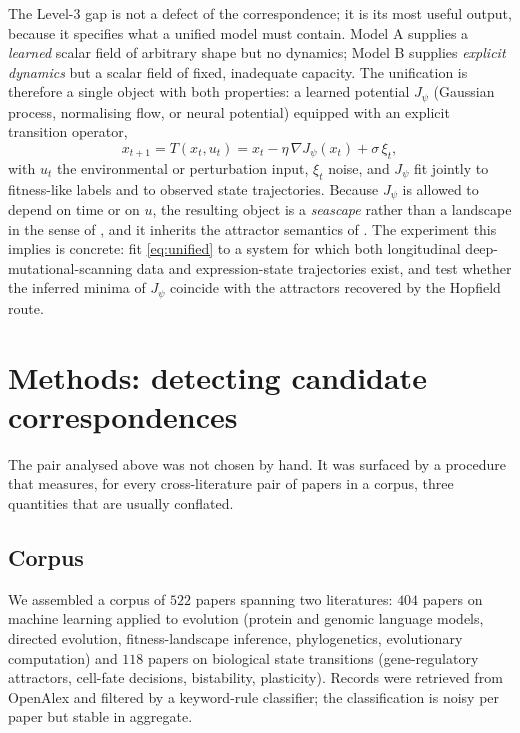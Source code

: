 \documentclass[11pt]{article}
\begin{document}
The Level-3 gap is not a defect of the correspondence; it is its most useful output, because it specifies what a
unified model must contain. Model A supplies a \emph{learned} scalar field of arbitrary shape but no dynamics;
Model B supplies \emph{explicit dynamics} but a scalar field of fixed, inadequate capacity. The unification is
therefore a single object with both properties: a learned potential $J_\psi$ (Gaussian process, normalising flow, or
neural potential) equipped with an explicit transition operator,
\begin{equation}
x_{t+1} = T\!\left(x_t,u_t\right) = x_t - \eta \,\nabla J_\psi(x_t) + \sigma\,\xi_t ,
\label{eq:unified}
\end{equation}
with $u_t$ the environmental or perturbation input, $\xi_t$ noise, and $J_\psi$ fit jointly to fitness-like labels
and to observed state trajectories. Because $J_\psi$ is allowed to depend on time or on $u$, the resulting object is
a \emph{seascape} rather than a landscape in the sense of \citet{mustonen2009seascapes}, and it inherits the
attractor semantics of \citet{wang2011waddington}. The experiment this implies is concrete: fit
\eqref{eq:unified} to a system for which both longitudinal deep-mutational-scanning data and expression-state
trajectories exist, and test whether the inferred minima of $J_\psi$ coincide with the attractors recovered by the
Hopfield route.

\section{Methods: detecting candidate correspondences}\label{sec:methods}

The pair analysed above was not chosen by hand. It was surfaced by a procedure that measures, for every
cross-literature pair of papers in a corpus, three quantities that are usually conflated.

\subsection{Corpus}
We assembled a corpus of $522$ papers spanning two literatures: $404$ papers on machine learning applied to
evolution (protein and genomic language models, directed evolution, fitness-landscape inference, phylogenetics,
evolutionary computation) and $118$ papers on biological state transitions (gene-regulatory attractors, cell-fate
decisions, bistability, plasticity). Records were retrieved from OpenAlex and filtered by a keyword-rule classifier;
the classification is noisy per paper but stable in aggregate.
\end{document}
